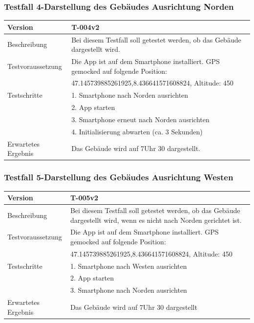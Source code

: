 \documentclass[a4paper]{scrreprt}
\begin{document}
\subsubsection{Testfall 4-Darstellung des Gebäudes Ausrichtung Norden}
\begin{tabularx}{\textwidth}{|l|X|}
\hline
	Version &
	T-004v2 \\ 
\hline 
	Beschreibung & 
	Bei diesem Testfall soll getestet werden, ob das Gebäude dargestellt wird. \\ 
\hline 
	Testvoraussetzung &
	Die App ist auf dem Smartphone installiert. GPS gemocked auf folgende Position: \\ & 
		47.145739885261925,8.436641571608824, Altitude: 450 \\ 
\hline 
	Testschritte & 
		1. Smartphone nach Norden ausrichten\\ &
		2. App starten\\ &
		3. Smartphone erneut nach Norden ausrichten\\ &
		4. Initialisierung abwarten (ca. 3 Sekunden)\\
\hline
	Erwartetes Ergebnis &
	Das Gebäude wird auf 7Uhr 30 dargestellt. \\
\hline
\end{tabularx}
\subsubsection{Testfall 5-Darstellung des Gebäudes Ausrichtung Westen}
\begin{tabularx}{\textwidth}{|l|X|}
\hline
	Version &

	T-005v2 \\ 
\hline 
	Beschreibung & 
	Bei diesem Testfall soll getestet werden, ob das Gebäude dargestellt wird, wenn es nicht nach Norden gerichtet ist. \\ 
\hline 
	Testvoraussetzung &
	Die App ist auf dem Smartphone installiert. GPS gemocked auf folgende Position: \\ &
		47.145739885261925,8.436641571608824, Altitude: 450 \\ 
\hline 
	Testschritte & 
		1. Smartphone nach Westen ausrichten\\ &
		2. App starten\\ &
		3. Smartphone nach Norden ausrichten\\
\hline
	Erwartetes Ergebnis &
	Das Gebäude wird auf 7Uhr 30 dargestellt\\ 
\hline 
\end{tabularx}
\end{document}
